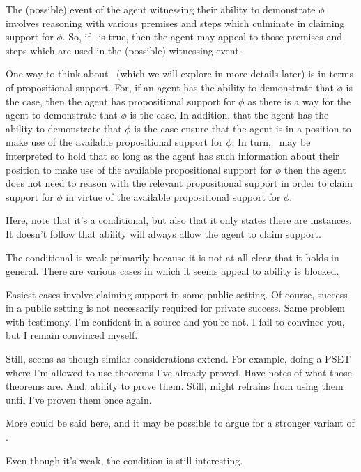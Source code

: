 \begin{note}
  The (possible) event of the agent witnessing their ability to demonstrate \(\phi\) involves reasoning with various premises and steps which culminate in claiming support for \(\phi\).
  So, if~\EASw{} is true, then the agent may appeal to those premises and steps which are used in the (possible) witnessing event.

  One way to think about~\EASw{} (which we will explore in more details later) is in terms of propositional support.
  For, if an agent has the ability to demonstrate that \(\phi\) is the case, then the agent has propositional support for \(\phi\) as there is a way for the agent to demonstrate that \(\phi\) is the case.
  In addition, that the agent has the ability to demonstrate that \(\phi\) is the case ensure that the agent is in a position to make use of the available propositional support for \(\phi\).
  In turn,~\EAS{} may be interpreted to hold that so long as the agent has such information about their position to make use of the available propositional support for \(\phi\) then the agent does not need to reason with the relevant propositional support in order to claim support for \(\phi\) in virtue of the available propositional support for \(\phi\).
\end{note}

\begin{note}[Conditional]
  Here, note that it's a conditional, but also that it only states there are instances.
  It doesn't follow that ability will always allow the agent to claim support.

  The conditional is weak primarily because it is not at all clear that it holds in general.
  There are various cases in which it seems appeal to ability is blocked.

  Easiest cases involve claiming support in some public setting.
  Of course, success in a public setting is not necessarily required for private success.
  Same problem with testimony.
  I'm confident in a source and you're not.
  I fail to convince you, but I remain convinced myself.

  Still, seems as though similar considerations extend.
  For example, doing a PSET where I'm allowed to use theorems I've already proved.
  Have notes of what those theorems are.
  And, ability to prove them.
  Still, might refrains from using them until I've proven them once again.

  More could be said here, and it may be possible to argue for a stronger variant of \EAS{}.

  Even though it's weak, the condition is still interesting.
\end{note}


